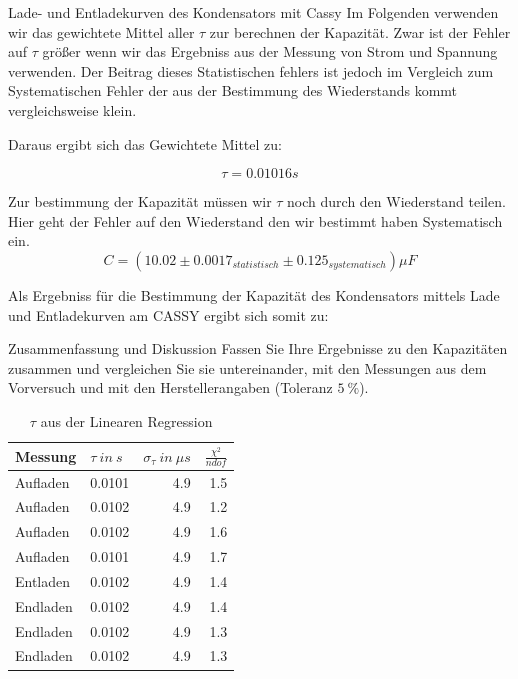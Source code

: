 \documentclass[twoside]{protokoll}
\begin{document}
\begin{aufgabe}{Lade- und Entladekurven des Kondensators mit Cassy}
Im Folgenden verwenden wir das gewichtete Mittel aller $\tau$ zur berechnen der Kapazität. 
Zwar ist der Fehler auf $\tau$ größer wenn wir das Ergebniss aus der Messung von Strom und Spannung verwenden. Der Beitrag dieses Statistischen fehlers ist jedoch im Vergleich zum Systematischen Fehler der aus der Bestimmung des Wiederstands kommt vergleichsweise klein.

Daraus ergibt sich das Gewichtete Mittel zu:

\begin{equation}
 \tau = 0.01016 s
\end{equation}


Zur bestimmung der Kapazität müssen wir $\tau$ noch durch den Wiederstand teilen. Hier geht der Fehler auf den Wiederstand den wir bestimmt haben Systematisch ein. 
\begin{equation}
    C = (10.02 \pm 0.0017_{statistisch} \pm 0.125_{systematisch}) \mu F
\end{equation}

Als Ergebniss für die Bestimmung der Kapazität des Kondensators mittels Lade und Entladekurven am CASSY ergibt sich somit zu:


\end{aufgabe}

\begin{aufgabe}{Zusammenfassung und Diskussion}
  Fassen Sie Ihre Ergebnisse zu den Kapazitäten zusammen und
  vergleichen Sie sie untereinander, mit den Messungen aus dem
  Vorversuch und mit den Herstellerangaben (Toleranz
  $\SI{5}{\percent}$).  

\begin{table}[H]
        \centering
        \begin{tabularx}{1\textwidth}{X X r r} %
            \toprule
            \textbf{Messung} & \textbf{$\tau \ in \ s$} & \textbf{$\sigma_{\tau} \ in \ \mu s$} & $\frac{\chi^2}{ndof}$ \\
            \midrule
            Aufladen & 0.0101 & 4.9 & 1.5 \\
            Aufladen & 0.0102 & 4.9 & 1.2 \\
            Aufladen & 0.0102 & 4.9 & 1.6 \\
            Aufladen & 0.0101 & 4.9 & 1.7 \\
            Entladen & 0.0102 & 4.9 & 1.4 \\
            Endladen & 0.0102 & 4.9 & 1.4 \\
            Endladen & 0.0102 & 4.9 & 1.3 \\
            Endladen & 0.0102 & 4.9 & 1.3 \\
            \bottomrule
        \end{tabularx}
        \caption{$\tau$ aus der Linearen Regression}
        \label{tab:mytable}
    \end{table}
  

\end{aufgabe}
 
\end{document}
